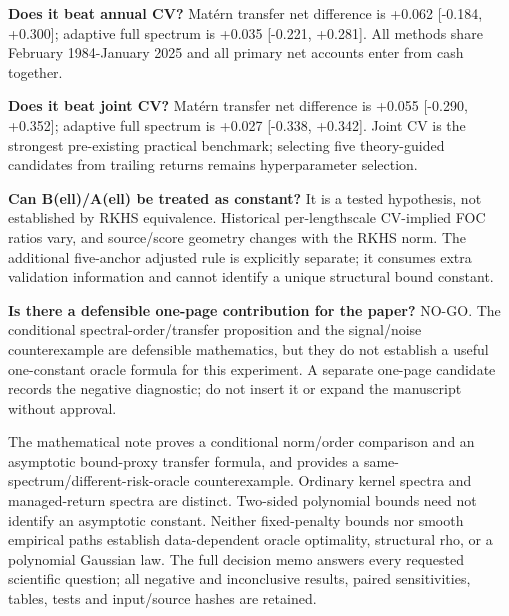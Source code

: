 \documentclass[11pt,letterpaper]{article}
\begin{document}
\textbf{Does it beat annual CV?} Matérn transfer net difference is +0.062 [-0.184, +0.300]; adaptive full spectrum is +0.035 [-0.221, +0.281]. All methods share February 1984-January 2025 and all primary net accounts enter from cash together.

\textbf{Does it beat joint CV?} Matérn transfer net difference is +0.055 [-0.290, +0.352]; adaptive full spectrum is +0.027 [-0.338, +0.342]. Joint CV is the strongest pre-existing practical benchmark; selecting five theory-guided candidates from trailing returns remains hyperparameter selection.

\textbf{Can B(ell)/A(ell) be treated as constant?} It is a tested hypothesis, not established by RKHS equivalence. Historical per-lengthscale CV-implied FOC ratios vary, and source/score geometry changes with the RKHS norm. The additional five-anchor adjusted rule is explicitly separate; it consumes extra validation information and cannot identify a unique structural bound constant.

\textbf{Is there a defensible one-page contribution for the paper?} NO-GO. The conditional spectral-order/transfer proposition and the signal/noise counterexample are defensible mathematics, but they do not establish a useful one-constant oracle formula for this experiment. A separate one-page candidate records the negative diagnostic; do not insert it or expand the manuscript without approval.

The mathematical note proves a conditional norm/order comparison and an
asymptotic bound-proxy transfer formula, and provides a same-spectrum/different-risk-oracle
counterexample. Ordinary kernel spectra and managed-return spectra are distinct.
Two-sided polynomial bounds need not identify an asymptotic constant. Neither
fixed-penalty bounds nor smooth empirical paths establish data-dependent oracle
optimality, structural rho, or a polynomial Gaussian law. The full decision memo
answers every requested scientific question; all negative and inconclusive results,
paired sensitivities, tables, tests and input/source hashes are retained.
\end{document}
